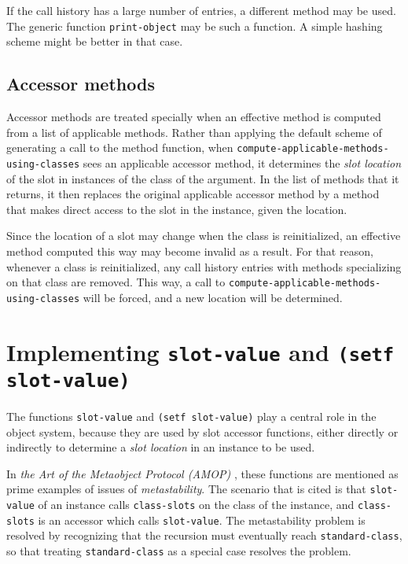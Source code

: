 If the call history has a large number of entries, a different method
may be used.  The generic function \texttt{print-object} may be such a
function.  A simple hashing scheme might be better in that case.

\subsection{Accessor methods}
\label{sec-generic-function-dispatch-accessor-methods}

Accessor methods are treated specially when an effective method is
computed from a list of applicable methods.  Rather than applying the
default scheme of generating a call to the method function, when
\texttt{compute-applicable-methods-using-classes} sees an applicable
accessor method, it determines the \emph{slot location} of the slot in
instances of the class of the argument.  In the list of methods that
it returns, it then replaces the original applicable accessor method
by a method that makes direct access to the slot in the instance,
given the location.

Since the location of a slot may change when the class is
reinitialized, an effective method computed this way may become
invalid as a result.  For that reason, whenever a class is
reinitialized, any call history entries with methods specializing on
that class are removed.  This way, a call to
\texttt{compute-applicable-methods-using-classes} will be forced, and
a new location will be determined. 

\section{Implementing \texttt{slot-value} and \texttt{(setf slot-value)}}

The functions \texttt{slot-value} and \texttt{(setf slot-value)} play
a central role in the object system, because they are used by slot
accessor functions, either directly or indirectly to determine a
\emph{slot location} in an instance to be used.  

In \emph{the Art of the Metaobject Protocol (AMOP)}
\cite{Kiczales:1991:AMP:574212}, these functions are mentioned as
prime examples of issues of \emph{metastability}.  The scenario that
is cited is that \texttt{slot-value} of an instance calls
\texttt{class-slots} on the class of the instance, and
\texttt{class-slots} is an accessor which calls \texttt{slot-value}.
The metastability problem is resolved by recognizing that the
recursion must eventually reach \texttt{standard-class}, so that
treating \texttt{standard-class} as a special case resolves the
problem.

